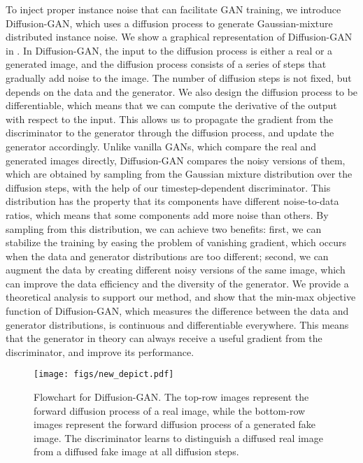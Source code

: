 \documentclass{article} \usepackage{iclr2023_conference,times}
\theoremstyle{plain}
\theoremstyle{definition}
\theoremstyle{remark}
\begin{document}
To inject proper instance noise
that can facilitate
GAN training, we introduce Diffusion-GAN, which uses a diffusion process to generate Gaussian-mixture distributed instance noise. We show a graphical representation of Diffusion-GAN in . In Diffusion-GAN, the input to the diffusion process is either a real or a generated image, and the diffusion process consists of a series of steps that gradually add noise to the image. The number of diffusion steps is not fixed, but depends on the data and the generator. We also design the diffusion process to be differentiable, which means that we can compute the derivative of the output with respect to the input. This allows us to propagate the gradient from the discriminator to the generator through the diffusion process, and update the generator accordingly. Unlike vanilla GANs, which compare the real and generated images directly, Diffusion-GAN compares the noisy versions of them, which are obtained by sampling from the Gaussian mixture distribution over the diffusion steps, {with the help of our timestep-dependent discriminator.} This distribution has the property that its components have different noise-to-data ratios, which means that some components add more noise than others. By sampling from this distribution, we can achieve two benefits: first, we can stabilize the training by  easing the problem of vanishing gradient, which occurs when the data and generator distributions are too different; second, we can augment the data by creating different noisy versions of the same image, which can improve the data efficiency and the diversity of the generator. We provide a theoretical analysis to support our method, and show that the min-max objective function of Diffusion-GAN, which measures the difference between the data and generator distributions, is continuous and differentiable everywhere. This means that the generator in theory can always receive a useful gradient from the discriminator, and improve its performance.


\begin{figure}[!t]
    \centering
    \texttt{[image: figs/new\_depict.pdf]}
     \vspace{-3mm}
    \caption{Flowchart for Diffusion-GAN. The top-row images represent the forward diffusion process of a real image, while the bottom-row images represent the forward diffusion process of a generated fake image. The discriminator learns to distinguish a diffused real image from a diffused fake image at all diffusion steps. }
    \label{fig:cda_diagram}
    \vspace{-4mm}
\end{figure}
\end{document}
